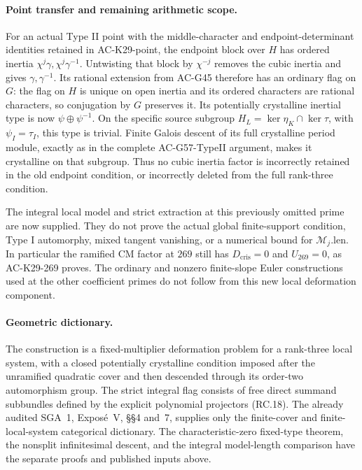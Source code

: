 \paragraph{Point transfer and remaining arithmetic scope.}
For an actual Type II point with the middle-character
and endpoint-determinant identities retained in
AC-K29-point, the endpoint block over \(H\) has
ordered inertia \(\chi^j\gamma,\chi^j\gamma^{-1}\).
Untwisting that block by \(\chi^{-j}\) removes
the cubic inertia and gives \(\gamma,\gamma^{-1}\).
Its rational extension from AC-G45 therefore has
an ordinary flag on \(G\): the flag on \(H\) is
unique on open inertia and its ordered characters
are rational characters, so conjugation by \(G\)
preserves it.  Its potentially crystalline
inertial type is now \(\psi\oplus\psi^{-1}\).
On the specific source subgroup
\(H_L=\ker\eta_K\cap\ker\tau\), with
\(\psi_I=\tau_I\), this type is trivial.
Finite Galois descent of its full crystalline
period module, exactly as in the complete
AC-G57-TypeII argument, makes it crystalline
on that subgroup.  Thus no cubic inertia
factor is incorrectly retained in the old
endpoint condition, or incorrectly deleted
from the full rank-three condition.

The integral local model and strict extraction
at this previously omitted prime are now supplied.
They do not prove the actual global finite-support
condition, Type I automorphy, mixed tangent
vanishing, or a numerical bound for
\(\mathcal M_j.\mathrm{len}\).
In particular the ramified CM factor at \(269\)
still has \(D_{\mathrm{cris}}=0\) and \(U_{269}=0\),
as AC-K29-269 proves.  The ordinary and nonzero
finite-slope Euler constructions used at the
other coefficient primes do not follow from
this new local deformation component.

\paragraph{Geometric dictionary.}
The construction is a fixed-multiplier deformation
problem for a rank-three local system, with a
closed potentially crystalline condition imposed
after the unramified quadratic cover and then
descended through its order-two automorphism
group.  The strict integral flag consists of
free direct summand subbundles defined by the
explicit polynomial projectors (RC.18).
The already audited SGA~1, Expos\'e~V,
\S\S4 and~7, supplies only the finite-cover and
finite-local-system categorical dictionary.
The characteristic-zero fixed-type theorem,
the nonsplit infinitesimal descent, and the
integral model-length comparison have the
separate proofs and published inputs above.
